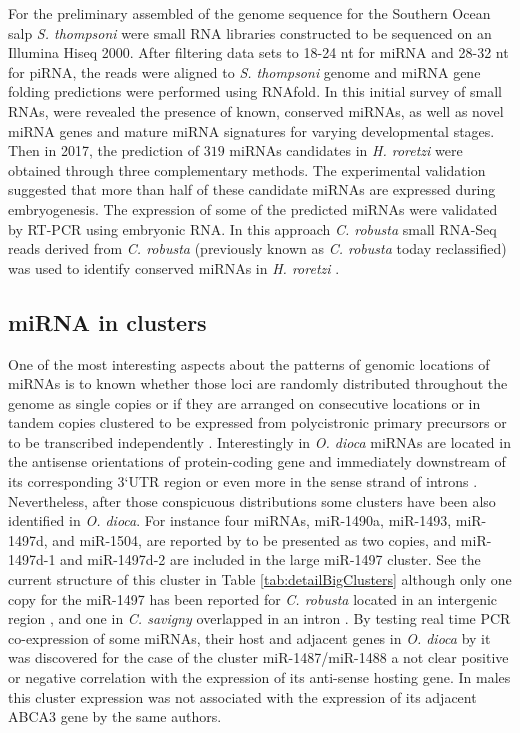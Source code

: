 \documentclass[graybox]{svmult}
\begin{document}
For the preliminary assembled of the genome sequence for the 
Southern Ocean salp \textit{S. thompsoni} \cite{Jue2016} were small RNA 
libraries constructed to be sequenced on an Illumina Hiseq 2000. After 
filtering 
data sets to 18-24 nt for miRNA and 28-32 nt for piRNA, the reads were aligned 
to \textit{S. thompsoni} genome and miRNA gene folding predictions were 
performed using RNAfold. In this initial survey of small RNAs, were revealed 
the 
presence of known, conserved miRNAs, as well as novel miRNA genes and mature 
miRNA signatures for varying developmental stages. Then in 2017, the prediction 
of $319$ miRNAs candidates in \textit{H. roretzi} were obtained through three 
complementary methods. The experimental validation suggested that more than 
half 
of these candidate miRNAs are expressed during embryogenesis. The expression of 
some of the predicted miRNAs were validated by RT-PCR using embryonic RNA. In 
this approach \textit{C. robusta} small RNA-Seq reads derived from \textit{C. 
robusta} \cite{Shi2009} (previously known as  \textit{C. robusta} today 
reclassified) was used to identify conserved miRNAs in \textit{H. roretzi} 
\cite{Wang2017}.


\subsection{miRNA in clusters}

One of the most interesting aspects about the patterns of genomic locations of 
miRNAs is to known whether those loci are randomly distributed throughout the 
genome as single copies or if they are arranged on consecutive locations or in 
tandem copies clustered to be expressed from polycistronic primary precursors 
or to be transcribed independently \cite{TanzerALL:2010}. Interestingly in 
\textit{O. dioca} miRNAs are located in the antisense orientations of 
protein-coding gene and immediately 
downstream of its corresponding 3`UTR region or even more in the sense strand 
of 
introns \cite{Fu2008}. Nevertheless, after those conspicuous distributions some 
clusters have been also identified in \textit{O. dioca}. For instance four 
miRNAs, miR-1490a, miR-1493, miR-1497d, and miR-1504, are reported by 
\cite{Fu2008} to be presented as two copies, and miR-1497d-1 and miR-1497d-2 
are 
included in the large miR-1497 cluster. See the current structure of this 
cluster in Table \ref{tab:detailBigClusters} although only one copy for the  
miR-1497 has been reported for \textit{C. robusta} located in an 
intergenic region \cite{Fu2008}, \cite{Hendrix2010} and one in \textit{C. 
savigny} overlapped in an intron \cite{Fu2008}. By testing real time PCR 
co-expression of some miRNAs, their host and adjacent genes in \textit{O. 
dioca} 
by \cite{Fu2008} it was discovered for the case of the cluster  
miR-1487/miR-1488 a not clear positive or negative correlation with the 
expression of its anti-sense hosting gene. In males this cluster expression was 
not associated with the expression of its adjacent ABCA3 gene by the same 
authors.  
\end{document}
